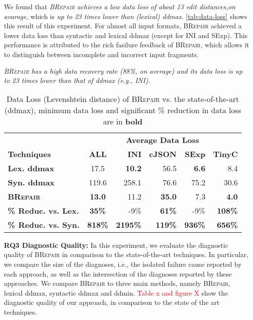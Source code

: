 \documentclass[sigconf,review,anonymous]{acmart}
\newenvironment{result}{\begin{framed}\centering\it}{\end{framed}}
\newcommand{\recheck}[1]{\textcolor{red}{#1}}
\newcommand{\approach}{\textsc{BRepair}\xspace}
\begin{document}
We found that \textit{\approach achieves a low data loss of about 13 edit distances,on avarage},  which is \textit{up to 23 times lower than (lexical) ddmax}. \autoref{tab:data-loss} shows this result of this experiment. For almost all input formats, \approach achieved a lower data loss than syntactic and lexical ddmaz (except for INI and SExp). This performance is attributed to the rich fasilure feedback of \approach, which allows it to distinguish between incomplete and incorrect input fragments. 

\begin{result}
\approach has a high data recovery rate (88\%, on average) and its data %
loss is up to 23 times lower than that of ddmax (e.g., INI).     
\end{result}


\begin{table}[!tbp]\centering
\caption{Data Loss (Levenshtein distance) of \approach vs. the state-of-the-art (ddmax), minimum data loss and significant \% reduction in data loss are in \textbf{bold}}
\begin{tabular}{|l | c | r  r  r  r |}
\hline
&  \multicolumn{5}{c|}{\textbf{Average Data Loss }}  \\
\textbf{Techniques} & \textbf{ALL} & \textbf{INI} & \textbf{cJSON} & \textbf{SExp} & \textbf{TinyC} \\
\hline
\textbf{Lex. ddmax} & 17.5 & \textbf{10.2} &	56.5 &	\textbf{6.6} &	 8.4 \\	
\textbf{Syn. ddmax} & 119.6 &  258.1 & 76.6 &	75.2 &	30.6 \\
\textbf{\approach} & \textbf{13.0}  & 11.2 &	\textbf{35.0} &	7.3 & \textbf{4.0} \\
\hline
\textbf{\% Reduc. vs. Lex.} & \textbf{35\%} &  -9\% & \textbf{61\%} & -9\% & \textbf{108\%} \\
\textbf{\% Reduc. vs. Syn.} & \textbf{818\%} & \textbf{2195\%} &	\textbf{119\%} & \textbf{936\%} &\textbf{ 656\%} \\
\hline
\end{tabular}
\label{tab:data-loss}
\end{table}


\noindent
\textbf{RQ3 Diagnostic Quality:} 
In this experiment, we evaluate the diagnostic quality of \approach in comparison to the state-of-the-art techniques. In particular, we compare the size of the diagnoses, i.e., the isolated failure cause reported by each approach, as well as the intersection of the diagnoses reported by these approaches. We compare \approach to three main methods, namely \approach, lexical ddmax, syntactic ddmax and ddmin.  \recheck{Table x and figure X} show the diagnostic quality of our approach, in comparison to the state of the art techniques. 
\end{document}
